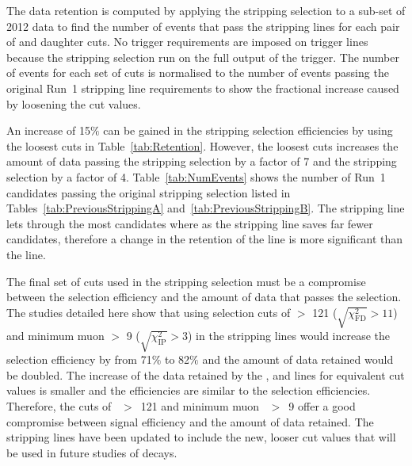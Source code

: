 The data retention is computed by applying the stripping selection to a sub-set of 2012 data to find the number of events that pass the stripping lines for each pair of \chiFD and daughter \chiIP cuts. No trigger requirements are imposed on trigger lines because the stripping selection run on the full output of the trigger. The number of events for each set of cuts is normalised to the number of events passing the original Run~1 stripping line requirements to show the fractional increase caused by loosening the cut values. 

An increase of 15$\%$ can be gained in the stripping selection efficiencies by using the loosest cuts in Table~\ref{tab:Retention}. However, the loosest cuts increases the amount of data passing the \bmumu stripping selection by a factor of 7 and the \bhh stripping selection by a factor of 4. Table~\ref{tab:NumEvents} shows the number of Run~1 candidates passing the original stripping selection listed in Tables~\ref{tab:PreviousStrippingA} and~\ref{tab:PreviousStrippingB}. The \bhh stripping line lets through the most candidates where as the \bmumu stripping line saves far fewer candidates, therefore a change in the retention of the \bhh line is more significant than the \bmumu line. 


The final set of cuts used in the stripping selection must be a compromise between the selection efficiency and the amount of data that passes the selection. The studies detailed here show that using selection cuts of \bs \chiFD $>$ 121 ($\sqrt{\chi^{2}_{\mathrm{FD}}} > 11$) and minimum muon \chiIP $>$ 9 ($\sqrt{\chi^{2}_{\mathrm{IP}}} > 3$) in the stripping lines would increase the \bmumu selection efficiency by from 71$\%$ to 82$\%$ and the amount of data retained would be doubled. The increase of the data retained by the \bhh, \bujpsik and \bsjpsiphi lines for equivalent cut values is smaller and the efficiencies are similar to the \bmumu selection efficiencies. Therefore, the cuts of \bs \chiFD~$>$~121 and minimum muon \chiIP~$>$~9 offer a good compromise between signal efficiency and the amount of data retained. The stripping lines have been updated to include the new, looser cut values that will be used in future studies of \bmumu decays. 


